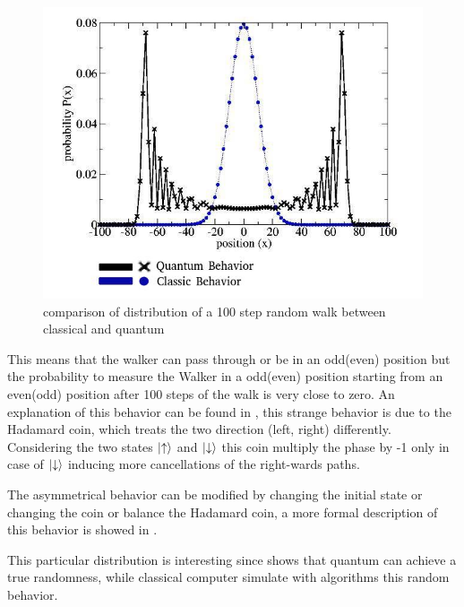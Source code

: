 \begin{figure}[h!]
    \includegraphics[scale=0.5]{img/dist.jpg}
    \caption{comparison of distribution of a 100 step random walk between classical and quantum}
    \centering
\end{figure}

This means that the walker can pass through or be in an odd(even) position but the probability to measure the Walker in a odd(even) position starting 
from an even(odd) position after 100 steps of the walk is very close to zero.  
An explanation of this behavior can be found in \cite{Kempe_2003}, this strange behavior is due to the Hadamard coin, which treats the two direction (left, right) differently. 
Considering the two states $\ket{\uparrow }$ and $\ket{\downarrow }$ this coin multiply the phase 
by -1 only in case of $\ket{\downarrow }$ inducing more cancellations of the right-wards paths.

The asymmetrical behavior can be modified by changing the initial state or 
changing the coin or balance the Hadamard coin, a more formal description of this behavior is showed in \cite{6812670}.

This particular distribution is interesting since shows that quantum can achieve a true randomness, while classical computer simulate with algorithms this random behavior. 
